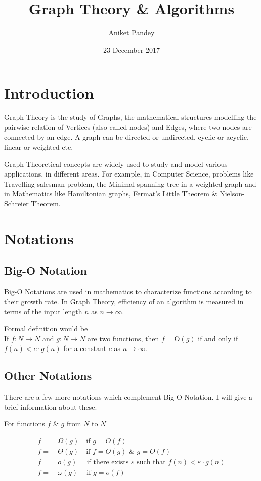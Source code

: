 \documentclass[11pt,a4paper]{extarticle}
\title{\textbf{Graph Theory \& Algorithms}}
\date{23 December 2017}
\author{Aniket Pandey}
\begin{document}
\maketitle

\section{Introduction}
Graph Theory is the study of Graphs, the mathematical structures modelling the pairwise relation of Vertices (also called nodes) and Edges, where two nodes are connected by an edge. A graph can be directed or undirected, cyclic or acyclic, linear or weighted etc. 

Graph Theoretical concepts are widely used to study and model various applications, in different areas. For example, in Computer Science, problems like Travelling salesman problem, the Minimal spanning tree in a weighted graph and in Mathematics like Hamiltonian graphs, Fermat's Little Theorem \& Nielson-Schreier Theorem. 

\section{Notations}
\subsection{Big-O Notation}
Big-O Notations are used in mathematics to characterize functions according to their growth rate. In Graph Theory, efficiency of an algorithm is measured in terms of the input length $n$ as $n\rightarrow \infty $.\par Formal definition would be\\If $f:N\rightarrow N$ and $g:N\rightarrow N$ are two functions, then $f=$O$(g)$ if and only if $f(n)<c \cdot g(n)$ for a constant $c$ as $n\rightarrow\infty$.
\subsection{Other Notations}
There are a few more notations which complement Big-O Notation. I will give a brief information about these.\par
For functions $f$ \& $g$ from $N$ to $N$

\begin{align}
f =&\:\Omega(g)\quad  \textrm{if} \,\,  g=O(f)\\
f =&\:\Theta(g)\quad \textrm{if} \,\,  f=O(g) \,\, \& \,\, g=O(f)\\
f =&\:o(g)\:\,\quad \textrm{if there exists }\varepsilon \textrm{ such that} \,\, f(n)<\varepsilon\cdot g(n) \\
f =&\:\omega(g)\quad \:\textrm{if} \,\,  g=o(f)
\end{align}
\end{document}
